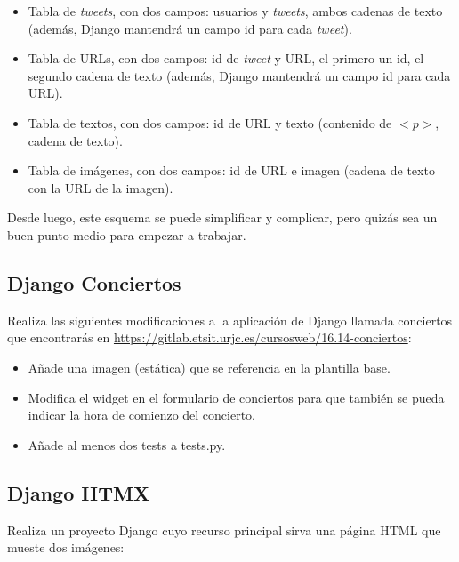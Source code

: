 \begin{itemize}
\item Tabla de \emph{tweets}, con dos campos: usuarios y \emph{tweets}, ambos cadenas de texto (además, Django mantendrá un campo id para cada \emph{tweet}).
\item Tabla de URLs, con dos campos: id de \emph{tweet} y URL, el primero un id, el segundo cadena de texto (además, Django mantendrá un campo id para cada URL).
\item Tabla de textos, con dos campos: id de URL y texto (contenido de $<p>$, cadena de texto).
\item Tabla de imágenes, con dos campos: id de URL e imagen (cadena de texto con la URL de la imagen).
\end{itemize}

Desde luego, este esquema se puede simplificar y complicar, pero quizás sea un buen punto medio para empezar a trabajar.

\subsection{Django Conciertos}
\label{subsec:django-conciertos}

Realiza las siguientes modificaciones a la aplicación de Django llamada conciertos que encontrarás en \url{https://gitlab.etsit.urjc.es/cursosweb/16.14-conciertos}:

\begin{itemize}
  \item Añade una imagen (estática) que se referencia en la plantilla base.
  \item Modifica el widget en el formulario de conciertos para que también se pueda indicar la hora de comienzo del concierto.
  \item Añade al menos dos tests a tests.py.
\end{itemize}

\subsection{Django HTMX}
\label{subsec:django-htmx}

Realiza un proyecto Django cuyo recurso principal sirva una página HTML que mueste dos imágenes:

